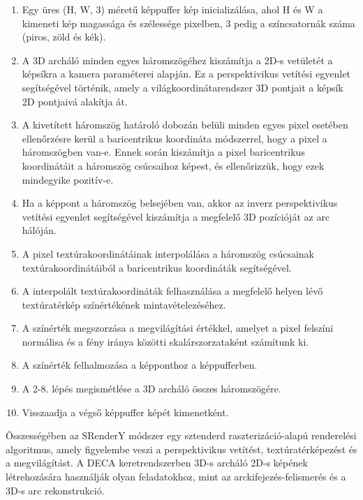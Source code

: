 \documentclass[12pt,a4]{article}
\begin{document}
 \begin{enumerate}
 
    \item Egy üres (H, W, 3) méretű képpuffer kép inicializálása, ahol H és W a kimeneti kép magassága és szélessége pixelben, 3 pedig a színcsatornák száma (piros, zöld és kék).

    \item A 3D archáló minden egyes háromszögéhez kiszámítja a 2D-s vetületét a képsíkra a kamera paraméterei alapján. Ez a perspektivikus vetítési egyenlet segítségével történik, 
 amely a világkoordinátarendszer 3D pontjait a képsík 2D pontjaivá alakítja át.

    \item A kivetített háromszög határoló dobozán belüli minden egyes pixel esetében ellenőrzésre kerül a baricentrikus koordináta módszerrel, hogy a pixel a háromszögben van-e. 
Ennek során kiszámítja a pixel baricentrikus koordinátáit a háromszög csúcsaihoz képest, és ellenőrizzük, hogy ezek mindegyike pozitív-e.
 
    \item Ha a képpont a háromszög belsejében van, akkor az inverz perspektivikus vetítési egyenlet segítségével kiszámítja a megfelelő 3D pozícióját az arc hálóján.

    \item A pixel textúrakoordinátáinak interpolálása a háromszög csúcsainak textúrakoordinátáiból a baricentrikus koordináták segítségével.

    \item A interpolált textúrakoordináták felhasználása a megfelelő helyen lévő textúratérkép színértékének mintavételezéséhez.

    \item A színérték megszorzása a megvilágítási értékkel, amelyet a pixel felszíni normálisa és a fény iránya közötti skalárszorzataként számítunk ki.

    \item A színérték felhalmozása a képponthoz a képpufferben.

    \item A 2-8. lépés megismétlése a 3D archáló összes háromszögére.

    \item Visszaadja a végső képpuffer képét kimenetként.
    
 \end{enumerate}

 Összességében az SRenderY módszer egy sztenderd raszterizáció-alapú renderelési algoritmus, amely figyelembe veszi a perspektivikus vetítést,
textúratérképezést és a megvilágítást. A DECA keretrendszerben 3D-s archáló 2D-s képének létrehozására használják olyan feladatokhoz, mint az arckifejezés-felismerés és a 3D-s arc rekonstrukció.
\end{document}
